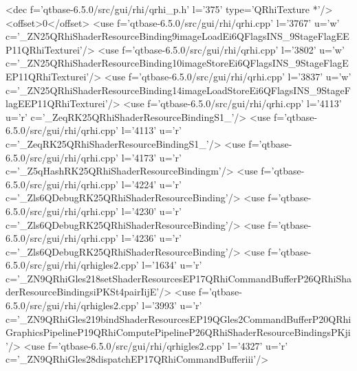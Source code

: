 <dec f='qtbase-6.5.0/src/gui/rhi/qrhi_p.h' l='375' type='QRhiTexture *'/>
<offset>0</offset>
<use f='qtbase-6.5.0/src/gui/rhi/qrhi.cpp' l='3767' u='w' c='_ZN25QRhiShaderResourceBinding9imageLoadEi6QFlagsINS_9StageFlagEEP11QRhiTexturei'/>
<use f='qtbase-6.5.0/src/gui/rhi/qrhi.cpp' l='3802' u='w' c='_ZN25QRhiShaderResourceBinding10imageStoreEi6QFlagsINS_9StageFlagEEP11QRhiTexturei'/>
<use f='qtbase-6.5.0/src/gui/rhi/qrhi.cpp' l='3837' u='w' c='_ZN25QRhiShaderResourceBinding14imageLoadStoreEi6QFlagsINS_9StageFlagEEP11QRhiTexturei'/>
<use f='qtbase-6.5.0/src/gui/rhi/qrhi.cpp' l='4113' u='r' c='_ZeqRK25QRhiShaderResourceBindingS1_'/>
<use f='qtbase-6.5.0/src/gui/rhi/qrhi.cpp' l='4113' u='r' c='_ZeqRK25QRhiShaderResourceBindingS1_'/>
<use f='qtbase-6.5.0/src/gui/rhi/qrhi.cpp' l='4173' u='r' c='_Z5qHashRK25QRhiShaderResourceBindingm'/>
<use f='qtbase-6.5.0/src/gui/rhi/qrhi.cpp' l='4224' u='r' c='_Zls6QDebugRK25QRhiShaderResourceBinding'/>
<use f='qtbase-6.5.0/src/gui/rhi/qrhi.cpp' l='4230' u='r' c='_Zls6QDebugRK25QRhiShaderResourceBinding'/>
<use f='qtbase-6.5.0/src/gui/rhi/qrhi.cpp' l='4236' u='r' c='_Zls6QDebugRK25QRhiShaderResourceBinding'/>
<use f='qtbase-6.5.0/src/gui/rhi/qrhigles2.cpp' l='1634' u='r' c='_ZN9QRhiGles218setShaderResourcesEP17QRhiCommandBufferP26QRhiShaderResourceBindingsiPKSt4pairIijE'/>
<use f='qtbase-6.5.0/src/gui/rhi/qrhigles2.cpp' l='3993' u='r' c='_ZN9QRhiGles219bindShaderResourcesEP19QGles2CommandBufferP20QRhiGraphicsPipelineP19QRhiComputePipelineP26QRhiShaderResourceBindingsPKji'/>
<use f='qtbase-6.5.0/src/gui/rhi/qrhigles2.cpp' l='4327' u='r' c='_ZN9QRhiGles28dispatchEP17QRhiCommandBufferiii'/>
